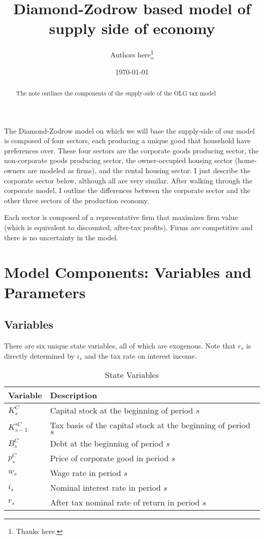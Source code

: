 \documentclass[article,11pt,letterpaper,fleqn]{article}
\author{Authors here\thanks{Thanks here.}}
\title{Diamond-Zodrow based model of supply side of economy}
\date{\today}
\theoremstyle{definition}
\numberwithin{equation}{section}
\begin{document}

\maketitle



\begin{abstract}
The note outlines the components of the supply-side of the OLG tax model
\end{abstract}


The Diamond-Zodrow model on which we will base the supply-side of our model is composed of four sectors, each producing a unique good that household have preferences over. These four sectors are the corporate goods producing sector, the non-corporate goods producing sector, the owner-occupied housing sector (home-owners are modeled as firms), and the rental housing sector.  I just describe the corporate sector below, although all are very similar.  After walking through the corporate model, I outline the differences between the corporate sector and the other three sectors of the production economy.

Each sector is composed of a representative firm that maximizes firm value (which is equivalent to discounted, after-tax profits).  Firms are competitive and there is no uncertainty in the model.

\section{Model Components: Variables and Parameters}
\label{sec:components}

\subsection{Variables}

There are six unique state variables, all of which are exogenous.  Note that $r_{s}$ is directly determined by $i_{s}$ and the tax rate on interest income.

\begin{table}[htbp]
  \centering
  \caption{State Variables}
    \begin{tabular}{ll}
    \hline
    \hline
    Variable & Description \\
    \hline
    $K^{C}_{s}$ & Capital stock at the beginning of period $s$ \\
    $K^{\tau C}_{s-1}$ & Tax basis of the capital stock at the beginning of period $s$\\
    $B^{C}_{s}$ & Debt at the beginning of period $s$ \\
    $p^{C}_{s}$ & Price of corporate good in period $s$ \\
    $w_{s}$ & Wage rate in period $s$ \\
    $i_{s}$ & Nominal interest rate in period $s$ \\
    $r_{s}$ & After tax nominal rate of return in period $s$ \\
    \hline
    \hline
    \end{tabular}%
  \label{tab:state_vars}%
\end{table}%
\end{document}
